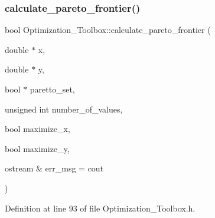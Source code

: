 \subsubsection{\texorpdfstring{calculate\+\_\+pareto\+\_\+frontier()}{calculate\_pareto\_frontier()}}
{\footnotesize\ttfamily bool Optimization\+\_\+\+Toolbox\+::calculate\+\_\+pareto\+\_\+frontier (\begin{DoxyParamCaption}\item[{double $\ast$}]{x,  }\item[{double $\ast$}]{y,  }\item[{bool $\ast$}]{paretto\+\_\+set,  }\item[{unsigned int}]{number\+\_\+of\+\_\+values,  }\item[{bool}]{maximize\+\_\+x,  }\item[{bool}]{maximize\+\_\+y,  }\item[{ostream \&}]{err\+\_\+msg = {\ttfamily cout} }\end{DoxyParamCaption})\hspace{0.3cm}{\ttfamily [static]}}



Definition at line 93 of file Optimization\+\_\+\+Toolbox.\+h.

